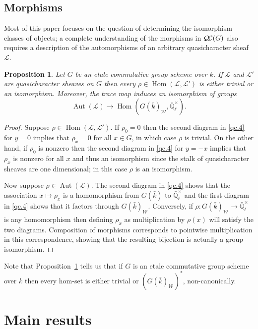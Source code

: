 \documentclass{amsart}
\theoremstyle{plain}
\newtheorem{proposition}[theorem]{Proposition}
\theoremstyle{definition}
\theoremstyle{remark}
\newcommand{\EE}{\mathbb{\bar Q}_\ell}
\newcommand{\bFq}{\bar{k}}
\newcommand{\Fq}{k}
\newcommand{\EEx}{\EE^\times}
\newcommand{\Weil}[1]{\mathcal{W}_{#1}}
\DeclareMathOperator{\Aut}{Aut}
\DeclareMathOperator{\Hom}{Hom}
\newcommand{\qcs}[1]{{\mathcal{#1}}}
\newcommand{\QC}{{\mathcal{Q\hskip-0.8pt C}}}
\begin{document}
\subsection{Morphisms}\label{sec:mor-etale}

Most of this paper focuses on the question of determining the isomorphism classes of objects; a complete understanding of the morphisms in $\QC(G)$ also requires a description of the automorphisms of an arbitrary quasicharacter sheaf $\qcs{L}$.

\begin{proposition}\label{prop:mor_etale}
Let $G$ be an etale commutative group scheme over $\Fq$.
If $\qcs{L}$ and $\qcs{L}'$ are quasicharacter sheaves on $G$ then
every $\rho\in \Hom(\qcs{L},\qcs{L}')$ is either trivial or an isomorphism. Moreover, the trace map induces an isomorphism of groups
\[
\Aut(\qcs{L}) \to \Hom(G(\bFq)_{\Weil{}}, \EEx).
\]
\end{proposition}

\begin{proof}
Suppose $\rho \in \Hom(\qcs{L},\qcs{L}')$.
If $\rho_0 = 0$ then the second diagram in \ref{qc.4} for $y=0$ implies that $\rho_x = 0$ for all $x\in G$, in which case $\rho$ is trivial.
On the other hand, if $\rho_0$ is nonzero then the second diagram in \ref{qc.4} for $y = -x$ implies that $\rho_x$ is nonzero for all $x$ and thus an isomorphism since the stalk of quasicharacter sheaves are one dimensional; in this case $\rho$ is an isomorphism.

Now suppose $\rho \in \Aut(\qcs{L})$.
The second diagram in \ref{qc.4} shows that the association $x \mapsto \rho_x$ is a homomorphism from $G(\bFq)$ to $\EEx$ and the first diagram in \ref{qc.4} shows that it factors through $G(\bFq)_{\Weil{}}$.  Conversely, if $\rho : G(\bFq)_{\Weil{}} \to \EEx$ is any homomorphism then defining $\rho_x$ as multiplication by $\rho(x)$ will satisfy the two diagrams.  Composition of morphisms corresponds to pointwise multiplication in this correspondence, showing that the resulting bijection is actually a group isomorphism.
\end{proof}

Note that Proposition~\ref{prop:mor_etale} tells us that if $G$ is an etale commutative group scheme over $\Fq$ then every hom-set is either trivial or $\left(G(\bFq)_{\Weil{}}\right)^*$, non-canonically.

\section{Main results}\label{sec:main}
\end{document}

